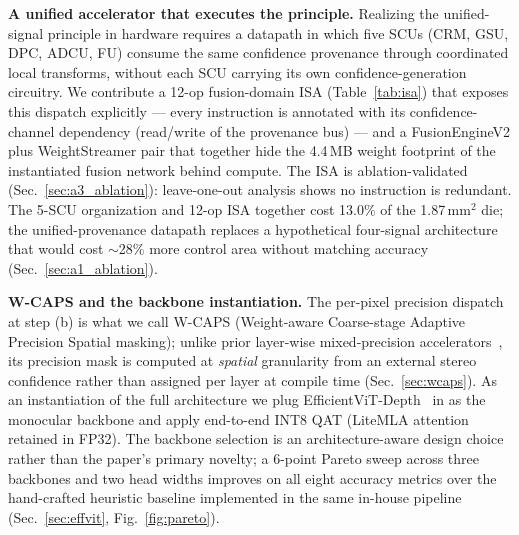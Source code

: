 \documentclass[journal]{IEEEtran}
\begin{document}
\textbf{A unified accelerator that executes the principle.} Realizing the unified-signal principle in hardware requires a datapath in which five SCUs (CRM, GSU, DPC, ADCU, FU) consume the same confidence provenance through coordinated local transforms, without each SCU carrying its own confidence-generation circuitry. We contribute a 12-op fusion-domain ISA (Table~\ref{tab:isa}) that exposes this dispatch explicitly --- every instruction is annotated with its confidence-channel dependency (read/write of the provenance bus) --- and a FusionEngineV2 plus WeightStreamer pair that together hide the 4.4\,MB weight footprint of the instantiated fusion network behind compute. The ISA is ablation-validated (Sec.~\ref{sec:a3_ablation}): leave-one-out analysis shows no instruction is redundant. The 5-SCU organization and 12-op ISA together cost 13.0\% of the 1.87\,mm$^2$ die; the unified-provenance datapath replaces a hypothetical four-signal architecture that would cost $\sim$28\% more control area without matching accuracy (Sec.~\ref{sec:a1_ablation}).

\textbf{W-CAPS and the backbone instantiation.} The per-pixel precision dispatch at step (b) is what we call W-CAPS (Weight-aware Coarse-stage Adaptive Precision Spatial masking); unlike prior layer-wise mixed-precision accelerators~\cite{sharma2018bitfusion,park2019olaccel}, its precision mask is computed at \emph{spatial} granularity from an external stereo confidence rather than assigned per layer at compile time (Sec.~\ref{sec:wcaps}). As an instantiation of the full architecture we plug EfficientViT-Depth~\cite{cai2023efficientvit} in as the monocular backbone and apply end-to-end INT8 QAT (LiteMLA attention retained in FP32). The backbone selection is an architecture-aware design choice rather than the paper's primary novelty; a 6-point Pareto sweep across three backbones and two head widths improves on all eight accuracy metrics over the hand-crafted heuristic baseline implemented in the same in-house pipeline (Sec.~\ref{sec:effvit}, Fig.~\ref{fig:pareto}).
\end{document}
